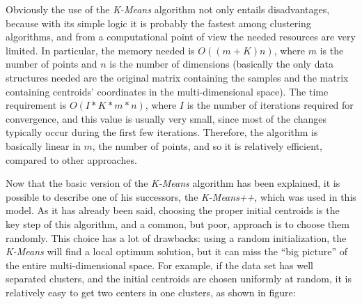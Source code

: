 \documentclass[12pt,a4paper,cucitura]{toptesi}
\begin{document}
Obviously the use of the \emph{K-Means} algorithm not only entails disadvantages, because with its simple logic it is probably the fastest among clustering algorithms, and from a computational point of view the needed resources are very limited.
In particular, the memory needed is $O((m + K)n)$, where $m$ is the number of points and $n$ is the number of dimensions (basically the only data structures needed are the original matrix containing the samples and the matrix containing centroids' coordinates in the multi-dimensional space).
The time requirement is $O(I \ast K \ast m \ast n)$, where $I$ is the number of iterations required for convergence, and this value is usually very small, since most of the changes typically occur during the first few iterations.
Therefore, the algorithm is basically linear in $m$, the number of points, and so it is relatively efficient, compared to other approaches.

Now that the basic version of the \emph{K-Means} algorithm has been explained, it is possible to describe one of his successors, the \emph{K-Means++}, which was used in this model.
As it has already been said, choosing the proper initial centroids is the key step of this algorithm, and a common, but poor, approach is to choose them randomly.
This choice has a lot of drawbacks: using a random initialization, the \emph{K-Means} will find a local optimum solution, but it can miss the ``big picture'' of the entire multi-dimensional space. 
For example, if the data set has well separated clusters, and the initial centroids are chosen uniformly at random, it is relatively easy to get two centers in one clusters, as shown in figure:

\begin{figure}
{}
\end{figure}
\end{document}
